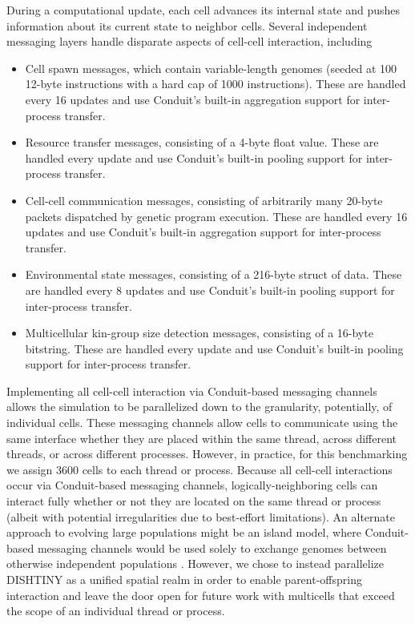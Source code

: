 During a computational update, each cell advances its internal state and pushes information about its current state to neighbor cells.
Several independent messaging layers handle disparate aspects of cell-cell interaction, including
\begin{itemize}
  \item Cell spawn messages, which contain variable-length genomes (seeded at 100 12-byte instructions with a hard cap of 1000 instructions). These are handled every 16 updates and use Conduit's built-in aggregation support for inter-process transfer.
  \item Resource transfer messages, consisting of a 4-byte float value. These are handled every update and use Conduit's built-in pooling support for inter-process transfer.
  \item Cell-cell communication messages, consisting of arbitrarily many 20-byte packets dispatched by genetic program execution. These are handled every 16 updates and use Conduit's built-in aggregation support for inter-process transfer.
  \item Environmental state messages, consisting of a 216-byte struct of data. These are handled every 8 updates and use Conduit's built-in pooling support for inter-process transfer.
  \item Multicellular kin-group size detection messages, consisting of a 16-byte bitstring. These are handled every update and use Conduit's built-in pooling support for inter-process transfer.
\end{itemize}

Implementing all cell-cell interaction via Conduit-based messaging channels allows the simulation to be parallelized down to the granularity, potentially, of individual cells.
These messaging channels allow cells to communicate using the same interface whether they are placed within the same thread, across different threads, or across different processes.
However, in practice, for this benchmarking we assign 3600 cells to each thread or process.
Because all cell-cell interactions occur via Conduit-based messaging channels, logically-neighboring cells can interact fully whether or not they are located on the same thread or process (albeit with potential irregularities due to best-effort limitations).
An alternate approach to evolving large populations might be an island model, where Conduit-based messaging channels would be used solely to exchange genomes between otherwise independent populations \citep{bennett1999building}.
However, we chose to instead parallelize DISHTINY as a unified spatial realm in order to enable parent-offspring interaction and leave the door open for future work with multicells that exceed the scope of an individual thread or process.
